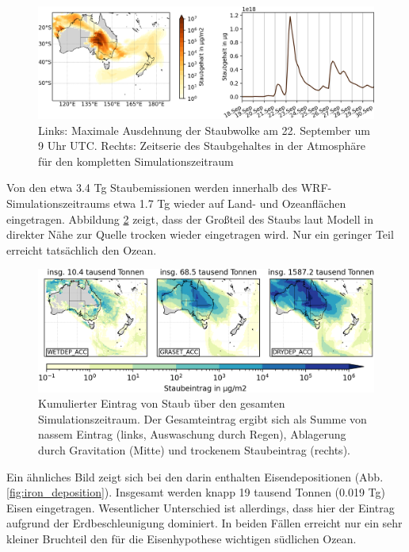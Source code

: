 \documentclass[12pt,a4paper,onecolumn,draft]{scrartcl}
\begin{document}
\begin{figure}
\includegraphics[width=\textwidth]{bilder/dustload_time.png}
\caption{Links: Maximale Ausdehnung der Staubwolke am 22. September um 9 Uhr UTC. Rechts: Zeitserie des Staubgehaltes in der Atmosphäre für den kompletten Simulationszeitraum} \label{fig:dustload_time}
\end{figure}
Von den etwa 3.4 Tg Staubemissionen werden innerhalb des WRF-Simulationszeitraums etwa 1.7 Tg wieder auf Land- und Ozeanflächen eingetragen. Abbildung \ref{fig:deposition} zeigt, dass der Großteil des Staubs laut Modell in direkter Nähe zur Quelle trocken wieder eingetragen wird. Nur ein geringer Teil erreicht tatsächlich den Ozean.
\begin{figure}
\includegraphics[width=\textwidth]{bilder/dust_deposition_vars.png}
\caption{Kumulierter Eintrag von Staub über den gesamten Simulationszeitraum. Der Gesamteintrag ergibt sich als Summe von nassem Eintrag (links, Auswaschung durch Regen), Ablagerung durch Gravitation (Mitte) und trockenem Staubeintrag (rechts).} \label{fig:deposition}
\end{figure}
Ein ähnliches Bild zeigt sich bei den darin enthalten Eisendepositionen (Abb. \ref{fig:iron_deposition}). Insgesamt werden knapp 19 tausend Tonnen (0.019 Tg) Eisen eingetragen. Wesentlicher Unterschied ist allerdings, dass hier der Eintrag aufgrund der Erdbeschleunigung dominiert. In beiden Fällen erreicht nur ein sehr kleiner Bruchteil den für die Eisenhypothese wichtigen südlichen Ozean.
\end{document}
